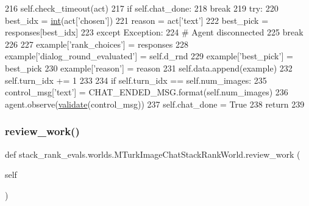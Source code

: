 \begin{DoxyCode}
216             self.check\_timeout(act)
217             \textcolor{keywordflow}{if} self.chat\_done:
218                 \textcolor{keywordflow}{break}
219             \textcolor{keywordflow}{try}:
220                 best\_idx = \hyperlink{namespacelanguage__model_1_1eval__ppl_a7d12ee00479673c5c8d1f6d01faa272a}{int}(act[\textcolor{stringliteral}{'chosen'}])
221                 reason = act[\textcolor{stringliteral}{'text'}]
222                 best\_pick = responses[best\_idx]
223             \textcolor{keywordflow}{except} Exception:
224                 \textcolor{comment}{# Agent disconnected}
225                 \textcolor{keywordflow}{break}
226 
227             example[\textcolor{stringliteral}{'rank\_choices'}] = responses
228             example[\textcolor{stringliteral}{'dialog\_round\_evaluated'}] = self.d\_rnd
229             example[\textcolor{stringliteral}{'best\_pick'}] = best\_pick
230             example[\textcolor{stringliteral}{'reason'}] = reason
231             self.data.append(example)
232             self.turn\_idx += 1
233 
234         \textcolor{keywordflow}{if} self.turn\_idx == self.num\_images:
235             control\_msg[\textcolor{stringliteral}{'text'}] = CHAT\_ENDED\_MSG.format(self.num\_images)
236             agent.observe(\hyperlink{namespaceparlai_1_1core_1_1worlds_afc3fad603b7bce41dbdc9cdc04a9c794}{validate}(control\_msg))
237         self.chat\_done = \textcolor{keyword}{True}
238         \textcolor{keywordflow}{return}
239 
\end{DoxyCode}
\mbox{\label{classstack__rank__evals_1_1worlds_1_1MTurkImageChatStackRankWorld_a47f6f4ec8f01b20228f9ed3c4cc4726f}} 
\subsubsection{\texorpdfstring{review\+\_\+work()}{review\_work()}}
{\footnotesize\ttfamily def stack\+\_\+rank\+\_\+evals.\+worlds.\+M\+Turk\+Image\+Chat\+Stack\+Rank\+World.\+review\+\_\+work (\begin{DoxyParamCaption}\item[{}]{self }\end{DoxyParamCaption})}



